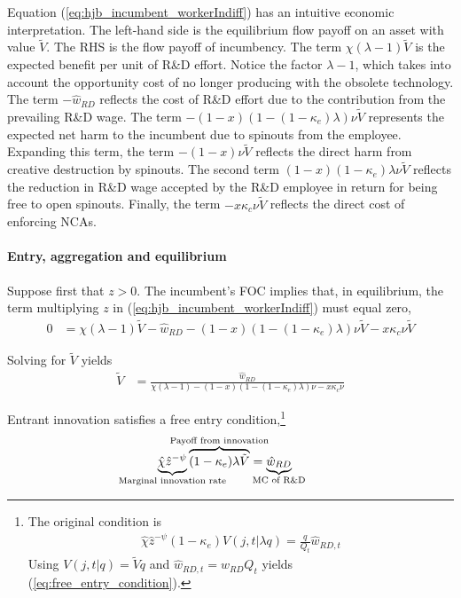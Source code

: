 \documentclass[11pt,english]{article}
\begin{document}
Equation (\ref{eq:hjb_incumbent_workerIndiff}) has an intuitive economic interpretation. The left-hand side is the equilibrium flow payoff on an asset with value $\tilde{V}$. The RHS is the flow payoff of incumbency. The term $\chi(\lambda -1) \tilde{V}$ is the expected benefit per unit of R\&D effort. Notice the factor $\lambda -1$, which takes into account the opportunity cost of no longer producing with the obsolete technology. The term $-\hat{w}_{RD}$ reflects the cost of R\&D effort due to the contribution from the prevailing R\&D wage. The term $-(1-x)(1 - (1-\kappa_e) \lambda) \nu \tilde{V}$ represents the expected net harm to the incumbent due to spinouts from the employee. Expanding this term, the term $-(1-x)\nu \tilde{V}$ reflects the direct harm from creative destruction by spinouts. The second term $(1-x)(1-\kappa_e)\lambda \nu \tilde{V}$ reflects the reduction in R\&D wage accepted by the R\&D employee in return for being free to open spinouts. Finally, the term $-x \kappa_c \nu \tilde{V}$ reflects the direct cost of enforcing NCAs.

\paragraph{Entry, aggregation and equilibrium}

Suppose first that $z > 0$. The incumbent's FOC implies that, in equilibrium, the term multiplying $z$ in (\ref{eq:hjb_incumbent_workerIndiff}) must equal zero,
\begin{align*}
	0 &= \chi(\lambda-1)\tilde{V}- \hat{w}_{RD} - (1-x)(1 - (1-\kappa_e)\lambda) \nu \tilde{V} - x \kappa_c \nu \tilde{V}
\end{align*}

Solving for $\tilde{V}$ yields
\begin{align}
	\tilde{V} &= \frac{\hat{w}_{RD}}{\chi(\lambda - 1) - (1-x) (1- (1-\kappa_e)\lambda)\nu - x \kappa_{c} \nu} \label{eq:hjb_incumbent_foc}
\end{align}

Entrant innovation satisfies a free entry condition,\footnote{The original condition is 
	\begin{align*}
		\hat{\chi} \hat{z}^{-\psi} (1-\kappa_e)  V(j,t|\lambda q) = \frac{q}{Q_t} \hat{w}_{RD,t}
	\end{align*}
	Using $V(j,t|q) = \tilde{V} q$ and $\hat{w}_{RD,t} = \hat{w}_{RD} Q_t$ yields (\ref{eq:free_entry_condition}).}
\begin{align}
	\underbrace{\hat{\chi} \hat{z}^{-\psi}}_{\mathclap{\text{Marginal innovation rate}}} \overbrace{(1-\kappa_e) \lambda \tilde{V}}^{\mathclap{\text{Payoff from innovation}}} &= \underbrace{\hat{w}_{RD}}_{\mathclap{\text{MC of R\&D}}} \label{eq:free_entry_condition}
\end{align}
\end{document}
